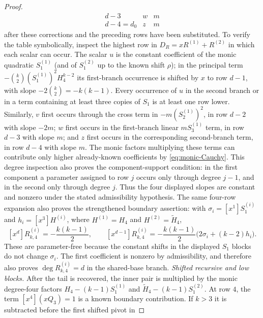 \begin{proof}
\[\begin{array}{c|c|c}
        d-3&w&m\\
        d-4=d_0&z&m
      \end{array}
      \tag{R-odd-base-table}
      \]
      after these corrections and the preceding rows have been substituted.
      To verify the table symbolically, inspect the highest row in
      $D_R=xR^{(1)}+R^{(2)}$ in which each scalar can occur.  The scalar $u$
      is the constant coefficient of the monic quadratic $S^{(1)}_1$ (and of
      $S^{(2)}_1$ up to the known shift $\rho$); in the principal term
      $-\binom{k}{2}(S^{(1)}_1)^2H_4^{k-2}$ its first-branch occurrence is
      shifted by $x$ to row $d-1$, with slope
      $-2\binom{k}{2}=-k(k-1)$.  Every occurrence of $u$ in the second branch
      or in a term containing at least three copies of $S_1$ is at least one
      row lower.  Similarly, $v$ first occurs through the cross term in
      $-m(S^{(1)}_2)^2$, in row $d-2$ with slope $-2m$; $w$ first occurs in
      the first-branch linear $mS^{(1)}_3$ term, in row $d-3$ with slope $m$;
      and $z$ first occurs in the corresponding second-branch term, in row
      $d-4$ with slope $m$.  The monic factors multiplying these terms can
      contribute only higher already-known coefficients by
      \eqref{eq:monic-Cauchy}.
      This degree inspection also proves the component-support condition: in
      the first component
      a parameter assigned to row $j$ occurs only through degree $j-1$, and
      in the second only through degree $j$.  Thus the four displayed slopes
      are constant and nonzero under the stated admissibility hypothesis.
      The same four-row expansion also proves the strengthened boundary
      assertion: with $\sigma_i=[x^{1}]S^{(i)}_1$ and
      $h_i=[x^3]H^{(i)}$, where $H^{(1)}=H_4$ and
      $H^{(2)}=\widetilde H_4$,
      \[
        [x^d]R^{(i)}_{k,4}=-\frac{k(k-1)}2,\qquad
        [x^{d-1}]R^{(i)}_{k,4}
          =-\frac{k(k-1)}2\bigl(2\sigma_i+(k-2)h_i\bigr).
      \]
      These are parameter-free because the constant shifts in the displayed
      $S_1$ blocks do not change $\sigma_i$.
      The first coefficient is nonzero by admissibility, and therefore also
      proves $\deg R^{(i)}_{k,4}=d$ in the shared-base branch.
      \smallskip\noindent\emph{Shifted recursive and low blocks.}
      After the tail is recovered, the inner pair is multiplied by the monic
      degree-four factors
      $H_4-(k-1)S^{(1)}_1$ and
      $\widetilde H_4-(k-1)S^{(2)}_1$.  At row $4$, the term
      $[x^4](xQ_3)=1$ is a known boundary contribution.  If $k>3$ it is
      subtracted before the first shifted pivot in

\end{proof}
